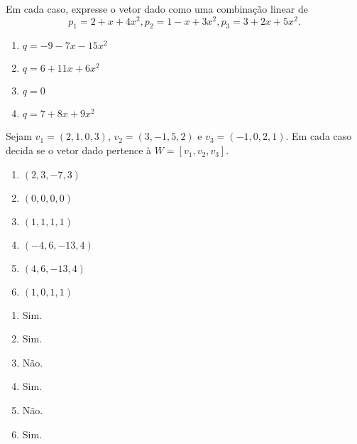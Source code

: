 \documentclass[12pt]{exam}
\begin{document}
\begin{exercicio}
    Em cada caso, expresse o vetor dado como uma combinação linear de
    \[
        p_1 = 2 + x + 4x^2,
        p_2 = 1 - x + 3x^2,
        p_3 = 3 + 2x + 5x^2.
    \]
    \begin{multicols}{2}
        \begin{enumerate}[label={\alph*})]
            \item $q = -9 -7x - 15x^2$

            \item $q = 6 + 11x + 6x^2$

            \item $q = 0$

            \item $q = 7 + 8x + 9x^2$
        \end{enumerate}
    \end{multicols}
\end{exercicio}

\begin{exercicio}
    Sejam $v_1 = (2, 1, 0, 3)$, $v_2 = (3, -1, 5, 2)$ e $v_3 = (-1, 0, 2, 1)$. Em cada caso decida se o vetor dado pertence à $W = [v_1, v_2, v_3]$.
    \begin{multicols}{2}
        \begin{enumerate}[label={\alph*})]
            \item $(2, 3, -7, 3)$

            \item $(0, 0, 0, 0)$

            \item $(1, 1, 1, 1)$

            \item $(-4, 6, -13, 4)$

            \item $(4, 6, -13, 4)$

            \item $(1, 0, 1, 1)$
        \end{enumerate}
    \end{multicols}
    \begin{solucao}
      \begin{multicols}{3}
        \begin{enumerate}[label={\alph*})]
          \item Sim.

          \item Sim.

          \item Não.

          \item Sim.

          \item Não.

          \item Sim.
        \end{enumerate}
      \end{multicols}
    \end{solucao}
\end{exercicio}
\end{document}
